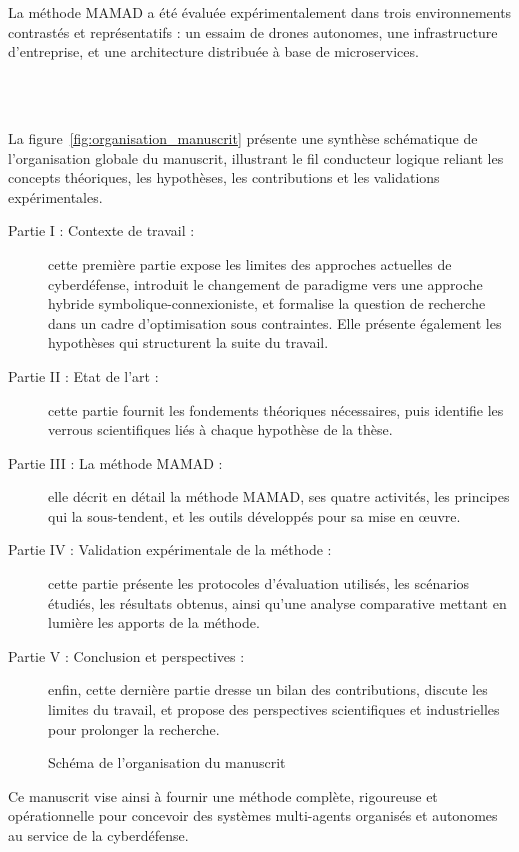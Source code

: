 La méthode MAMAD a été évaluée expérimentalement dans trois environnements contrastés et représentatifs : un essaim de drones autonomes, une infrastructure d'entreprise, et une architecture distribuée à base de microservices.

\

\bigskip

\\

La figure~\autoref{fig:organisation_manuscrit} présente une synthèse schématique de l'organisation globale du manuscrit, illustrant le fil conducteur logique reliant les concepts théoriques, les hypothèses, les contributions et les validations expérimentales.
%
\begin{description}
    \item[Partie I : Contexte de travail :] cette première partie expose les limites des approches actuelles de cyberdéfense, introduit le changement de paradigme vers une approche hybride symbolique-connexioniste, et formalise la question de recherche dans un cadre d'optimisation sous contraintes. Elle présente également les hypothèses qui structurent la suite du travail.

    \item[Partie II : Etat de l'art :] cette partie fournit les fondements théoriques nécessaires, puis identifie les verrous scientifiques liés à chaque hypothèse de la thèse.

    \item[Partie III : La méthode MAMAD :] elle décrit en détail la méthode MAMAD, ses quatre activités, les principes qui la sous-tendent, et les outils développés pour sa mise en œuvre.

    \item[Partie IV : Validation expérimentale de la méthode :] cette partie présente les protocoles d'évaluation utilisés, les scénarios étudiés, les résultats obtenus, ainsi qu'une analyse comparative mettant en lumière les apports de la méthode.

    \item[Partie V : Conclusion et perspectives :] enfin, cette dernière partie dresse un bilan des contributions, discute les limites du travail, et propose des perspectives scientifiques et industrielles pour prolonger la recherche.
\end{description}
%
\vspace{1em}
%
\begin{figure}[h!]
    \centering
    \resizebox{\textwidth}{!}{%
        
    }
    \caption{Schéma de l'organisation du manuscrit}
    \label{fig:organisation_manuscrit}
\end{figure}
%
Ce manuscrit vise ainsi à fournir une méthode complète, rigoureuse et opérationnelle pour concevoir des systèmes multi-agents organisés et autonomes au service de la cyberdéfense.

\cleardoublepage
